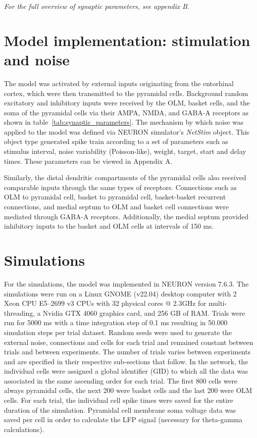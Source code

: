 \noindent
\textit{For the full overview of synaptic parameters, see appendix B.}\pagebreak

\section{Model implementation: stimulation and noise}
The model was activated by external inputs originating from the entorhinal
cortex, which were then transmitted to the pyramidal cells. Background random
excitatory and inhibitory inputs were received by the OLM, basket cells, and
the soma of the pyramidal cells via their AMPA, NMDA, and GABA-A receptors as
shown in table~\ref{tab:synaptic_parameters}. The mechanism by which noise was
applied to the model was defined via NEURON simulator's \textit{NetStim}
object. This object type generated spike train according to a set of parameters
such as stimulus interval, noise variability (Poisson-like), weight, target,
start and delay times. These parameters can be viewed in Appendix A.

Similarly, the distal dendritic compartments of the pyramidal cells also
received comparable inputs through the same types of receptors. Connections
such as OLM to pyramidal cell, basket to pyramidal cell, basket-basket
recurrent connections, and medial septum to OLM and basket cell connections
were mediated through GABA-A receptors. Additionally, the medial septum
provided inhibitory inputs to the basket and OLM cells at intervals of 150 ms.

\section{Simulations}
For the simulations, the model was implemented in NEURON version 7.6.3. The
simulations were run on a Linux GNOME (v22.04) desktop computer with 2 Xeon CPU
E5--2699 v3 CPUs with 32 physical cores @ 2.3GHz for multi-threading, a Nvidia
GTX 4060 graphics card, and 256 GB of RAM\@. Trials were run for 5000 ms with a
time integration step of 0.1 ms resulting in 50.000 simulation steps per trial
dataset. Random seeds were used to generate the external noise, connections and
cells for each trial and remained constant between trials and between
experiments. The number of trials varies between experiments and are specified
in their respective sub-sections that follow. In the network, the individual
cells were assigned a global identifier (GID) to which all the data was
associated in the same ascending order for each trial. The first 800 cells were
always pyramidal cells, the next 200 were basket cells and the last 200 were
OLM cells. For each trial, the individual cell spike times were saved for the
entire duration of the simulation. Pyramidal cell membrane soma voltage data
was saved per cell in order to calculate the LFP signal (necessary for
theta-gamma calculations).

